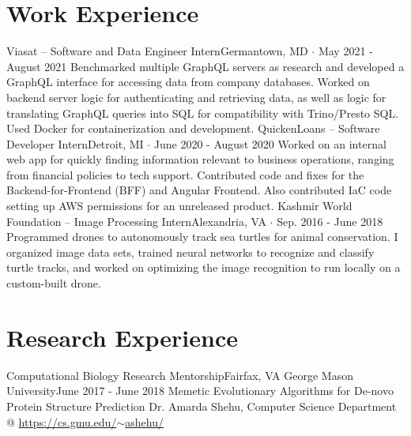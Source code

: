 \documentclass[11pt]{article}
\begin{document}
\section{Work Experience}
  \resumeSubHeadingListStart
    \resumeWorkHeading
      {Viasat -- \textmd{Software and Data Engineer Intern}}{Germantown, MD $\cdotp$ May 2021 - August 2021}
      \resumeItemListStart
          {Benchmarked multiple GraphQL servers as research and developed a GraphQL interface for accessing data from company databases. Worked on backend server logic for authenticating and retrieving data, as well as logic for translating GraphQL queries into SQL for compatibility with Trino/Presto SQL. Used Docker for containerization and development.}
      \resumeItemListEnd
    \resumeWorkHeading
      {QuickenLoans -- \textmd{Software Developer Intern}}{Detroit, MI $\cdotp$ June 2020 - August 2020}
      \resumeItemListStart
          {Worked on an internal web app for quickly finding information relevant to business operations, ranging from financial policies to tech support. Contributed code and fixes for the Backend-for-Frontend (BFF) and Angular Frontend. Also contributed IaC code setting up AWS permissions for an unreleased product.}
      \resumeItemListEnd
    \resumeWorkHeading
      {Kashmir World Foundation -- \textmd{Image Processing Intern}}{Alexandria, VA $\cdotp$ Sep. 2016 - June 2018}
      \resumeItemListStart
          {Programmed drones to autonomously track sea turtles for animal conservation. I organized image data sets, trained neural networks to recognize and classify turtle tracks, and worked on optimizing the image recognition to run locally on a custom-built drone.}
      \resumeItemListEnd
  \resumeSubHeadingListEnd
  
\section{Research Experience}
  \resumeSubHeadingListStart
    \resumeSubheading
      {Computational Biology Research Mentorship}{Fairfax, VA}
      {George Mason University}{June 2017 - June 2018}
      \resumeItemListStart
          {Memetic Evolutionary Algorithms for De-novo Protein Structure Prediction}
          {Dr. Amarda Shehu, Computer Science Department @ \href{https://cs.gmu.edu/~ashehu/}{https://cs.gmu.edu/$\sim$ashehu/}}
      \resumeItemListEnd
\end{document}
